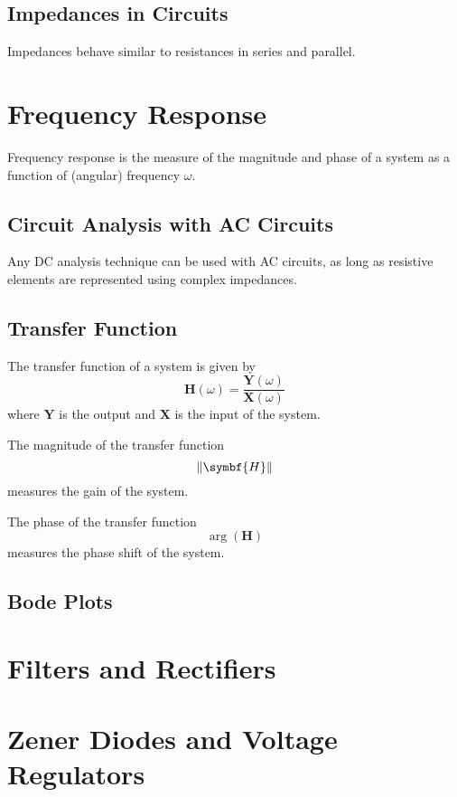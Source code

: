 \documentclass{article}
\begin{document}
\subsection{Impedances in Circuits}
\begin{theorem}
    Impedances behave similar to resistances in series and parallel.
\end{theorem}
\newpage
\section{Frequency Response}
Frequency response is the measure of the magnitude and phase of a system as a function of (angular) frequency $\omega$.
\subsection{Circuit Analysis with AC Circuits}
\begin{theorem}
    Any DC analysis technique can be used with AC circuits, as long as 
    resistive elements are represented using complex impedances.
\end{theorem}
\subsection{Transfer Function}
\begin{definition}
    The transfer function of a system is given by
    \begin{equation*}
        \symbf{H}(\omega) = \frac{\symbf{Y}(\omega)}{\symbf{X}(\omega)}
    \end{equation*}
    where $\symbf{Y}$ is the output and $\symbf{X}$ is the input of the system.
\end{definition}
\begin{definition}[Gain]
    The magnitude of the transfer function
    \begin{equation*}
        \norm{\symbf{H}}
    \end{equation*}
    measures the gain of the system.
\end{definition}
\begin{definition}
    The phase of the transfer function
    \begin{equation*}
        \arg{\left( \symbf{H} \right)}
    \end{equation*}
    measures the phase shift of the system.
\end{definition}
\subsection{Bode Plots}
\newpage
\section{Filters and Rectifiers}
\newpage
\section{Zener Diodes and Voltage Regulators}
\newpage
\end{document}
